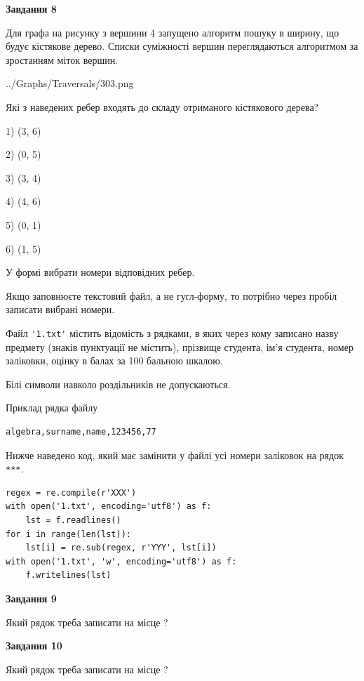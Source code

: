\documentclass[12pt, ukrainian]{article}
\def\code#1{\Verb!#1!}
\begin{document}
{\begin {large}
{\begin {center}\textbf{Завдання 8}\end {center}}\par
Для графа на рисунку з вершини 4 запущено алгоритм пошуку в ширину, що будує кістякове дерево. Списки суміжності вершин переглядаються алгоритмом за зростанням міток вершин.\par
\begin{center}
	{../Graphs/Traversals/303.png}
\end{center}
\par Які з наведених ребер входять до складу отриманого кістякового дерева?\par
1) (3, 6)\par
2) (0, 5)\par
3) (3, 4)\par
4) (4, 6)\par
5) (0, 1)\par
6) (1, 5)\par
{\vskip 15pt} У формі вибрати номери відповідних ребер.


Якщо заповнюєте текстовий файл, а не гугл-форму, то потрібно через пробіл записа\-ти вибрані номери.\par
\newpage


Файл \code{'1.txt'} містить відомість з рядками, в яких через кому записа\-но назву предмету (знаків пунктуації не містить), прізвище студента, ім'я студента, номер залі\-ков\-ки, оцінку в балах за 100 бальною шкалою.

Білі символи навколо роздільників не допускаються.

Приклад рядка файлу



\begin{verbatim}
algebra,surname,name,123456,77
\end{verbatim}


Нижче наведено код, який має замінити у файлі усі номери заліковок на рядок \code{***}.



\begin{verbatim}
regex = re.compile(r'XXX')
with open('1.txt', encoding='utf8') as f:
    lst = f.readlines()
for i in range(len(lst)):
    lst[i] = re.sub(regex, r'YYY', lst[i])
with open('1.txt', 'w', encoding='utf8') as f:
    f.writelines(lst)
\end{verbatim}




{\begin {center}\textbf{Завдання 9}\end {center}}\par
Який рядок треба записати на місце  ?\par
\vspace{5mm}


{\begin {center}\textbf{Завдання 10}\end {center}}\par
Який рядок треба записати на місце  ?\par


\newpage


\end {large}}
\end{document}
